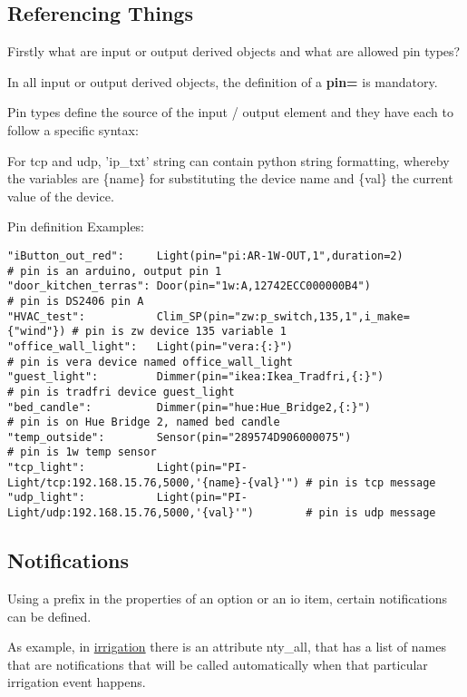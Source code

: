 \subsection{Referencing Things}

Firstly what are input or output derived objects and what are allowed
pin types?

In all input or output derived objects, the definition of a
\textbf{pin=} is mandatory.

Pin types define the source of the input / output element and they have
each to follow a specific syntax:



For tcp and udp, 'ip\_txt' string can contain python string formatting,
whereby the variables are \{name\} for substituting the device name and
\{val\} the current value of the device.

Pin definition Examples:

\begin{verbatim}
"iButton_out_red":     Light(pin="pi:AR-1W-OUT,1",duration=2)           # pin is an arduino, output pin 1
"door_kitchen_terras": Door(pin="1w:A,12742ECC000000B4")                # pin is DS2406 pin A 
"HVAC_test":           Clim_SP(pin="zw:p_switch,135,1",i_make={"wind"}) # pin is zw device 135 variable 1
"office_wall_light":   Light(pin="vera:{:}")                            # pin is vera device named office_wall_light
"guest_light":         Dimmer(pin="ikea:Ikea_Tradfri,{:}")              # pin is tradfri device guest_light
"bed_candle":          Dimmer(pin="hue:Hue_Bridge2,{:}")                # pin is on Hue Bridge 2, named bed candle
"temp_outside":        Sensor(pin="289574D906000075")                   # pin is 1w temp sensor 
"tcp_light":           Light(pin="PI-Light/tcp:192.168.15.76,5000,'{name}-{val}'") # pin is tcp message 
"udp_light":           Light(pin="PI-Light/udp:192.168.15.76,5000,'{val}'")        # pin is udp message
\end{verbatim}

\subsection{Notifications}

Using a prefix in the properties of an option or an io item, certain
notifications can be defined.

As example, in \href{docs/irrigation.md}{irrigation} there is an
attribute nty\_all, that has a list of names that are notifications that
will be called automatically when that particular irrigation event
happens.

